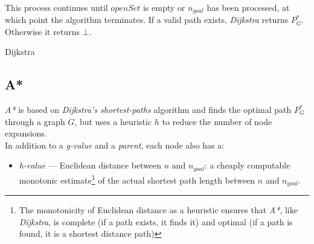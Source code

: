 \documentclass[12pt,notitlepage]{report}
\begin{document}
\\
\noindent
This process continues until $openSet$ is empty or $n_{goal}$ has been processed, at which point the algorithm terminates. If a valid path exists, {\em Dijkstra} returns $P^{*}_{G}$. Otherwise it returns $\bot$.\

\begin{algorithm}
  \SetAlgoLined\DontPrintSemicolon
  \setcounter{AlgoLine}{0}
  \caption{{\sc Dijkstra}}
\end{algorithm} 

\subsection {A*}

{\em A*} is based on {\em Dijkstra's shortest-paths} algorithm and finds the optimal path\cite{Hart68} $P^{*}_{G}$ through a graph $G$, but uses a heuristic $h$ to reduce the number of node expansions.\\

\noindent
In addition to a {\em g-value} and a {\em parent}, each node also has a:
\begin{itemize}
\item {\em h-value} --- Euclidean distance between {$n$} and {$n_{goal}$}: a cheaply computable monotonic estimate\footnote{The monotonicity of Euclidean distance as a heuristic ensures that {\em A*}, like {\em Dijkstra}, is complete (if a path exists, it finds it) and optimal (if a path is found, it is a shortest distance path)} of the actual shortest path length between $n$ and $n_{goal}$.
\end{itemize}
\end{document}
